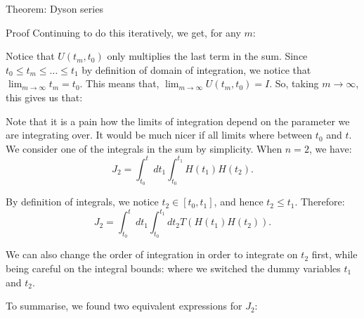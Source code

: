 \documentclass[a4paper]{article}
\begin{document}
\begin{parag}{Theorem: Dyson series}
\begin{subparag}{Proof}
        Continuing to do this iteratively, we get, for any $m$: 
        
        Notice that $U\left(t_m, t_0\right)$ only multiplies the last term in the sum. Since $t_0 \leq t_m \leq \ldots \leq t_1$ by definition of domain of integration, we notice that $\lim_{m \to \infty} t_m = t_0$. This means that, $\lim_{m \to \infty} U\left(t_m, t_0\right) = I$. So, taking $m \to \infty$, this gives us that: 

        Note that it is a pain how the limits of integration depend on the parameter we are integrating over. It would be much nicer if all limits where between $t_0$ and $t$. We consider one of the integrals in the sum by simplicity. When $n = 2$, we have: 
        \[J_2 = \int_{t_0}^{t} dt_1 \int_{t_0}^{t_1} H\left(t_1\right) H\left(t_2\right).\]
        
        By definition of integrals, we notice $t_2 \in \left[t_0, t_1\right]$, and hence $t_2 \leq t_1$. Therefore: 
        \[J_2 = \int_{t_0}^{t} dt_1 \int_{t_0}^{t_1} dt_2 T\left(H\left(t_1\right) H\left(t_2\right)\right).\]
        
        We can also change the order of integration in order to integrate on $t_2$ first, while being careful on the integral bounds:
        where we switched the dummy variables $t_1$ and $t_2$.
        
        To summarise, we found two equivalent expressions for $J_2$: 


\end{subparag}
\end{parag}
\end{document}
